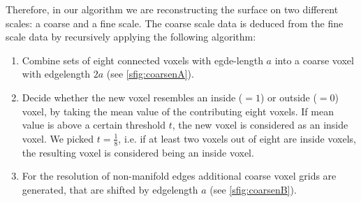 Therefore, in our algorithm we are reconstructing the surface on two different scales: a coarse and a fine scale. The coarse scale data is deduced from the fine scale data by recursively applying the following algorithm:
\begin{enumerate}
\item Combine sets of eight connected voxels with egde-length $a$ into a coarse voxel with edgelength $2a$ (see \autoref{sfig:coarsenA}).
\item Decide whether the new voxel resembles an inside ($=1$) or outside ($=0$) voxel, by taking the mean value of the contributing eight voxels. If mean value is above a certain threshold $t$, the new voxel is considered as an inside voxel. We picked $t=\frac{1}{8}$, i.e. if at least two voxels out of eight are inside voxels, the resulting voxel is considered being an inside voxel.
\item For the resolution of non-manifold edges additional coarse voxel grids are generated, that are shifted by edgelength $a$ (see \autoref{sfig:coarsenB}).
\end{enumerate}
